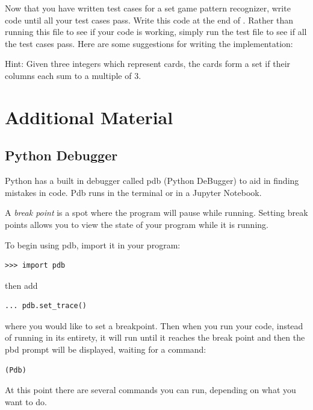 \begin{problem}
Now that you have written test cases for a set game pattern recognizer, write code until all your test cases pass. Write this code at the end of . Rather than running this file to see if your code is working, simply run the test file to see if all the test cases pass. Here are some suggestions for writing the implementation:

Hint: Given three integers which represent cards, the cards form a set if their columns each sum to a multiple of 3.

\end{problem}

\section*{Additional Material} %

\subsection*{Python Debugger} %

Python has a built in debugger called pdb (Python DeBugger) to aid in finding mistakes in code.
Pdb runs in the terminal or in a Jupyter Notebook.

A \emph{break point} is a spot where the program will pause while running.
Setting break points allows you to view the state of your program while it is running.

To begin using pdb, import it in your program:

\begin{lstlisting}
>>> import pdb
\end{lstlisting}

then add

\begin{lstlisting}
... pdb.set_trace()
\end{lstlisting}

where you would like to set a breakpoint.
Then when you run your code, instead of running in its entirety, it will run until it reaches the break point and then the pbd prompt will be displayed, waiting for a command:

\begin{lstlisting}
(Pdb)
\end{lstlisting}

At this point there are several commands you can run, depending on what you want to do.

